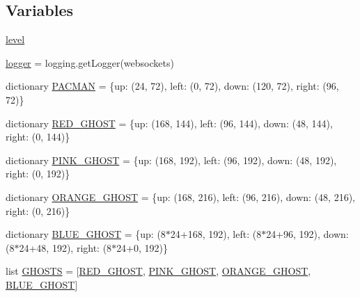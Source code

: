 \subsection*{Variables}
\begin{DoxyCompactItemize}
\item 
\hyperlink{namespaceviewer_ae5293c9bdae639c8c4c58c076722d755}{level}
\item 
\hyperlink{namespaceviewer_a7a420ec0e1bb58775b845f32c4674daa}{logger} = logging.\+get\+Logger(\textquotesingle{}websockets\textquotesingle{})
\item 
dictionary \hyperlink{namespaceviewer_a3bd33705051ffc40b5bfd35e243ae0ac}{P\+A\+C\+M\+AN} = \{\textquotesingle{}up\textquotesingle{}\+: (24, 72), \textquotesingle{}left\textquotesingle{}\+: (0, 72), \textquotesingle{}down\textquotesingle{}\+: (120, 72), \textquotesingle{}right\textquotesingle{}\+: (96, 72)\}
\item 
dictionary \hyperlink{namespaceviewer_a49becc796180fd2036cad73589a3cfcc}{R\+E\+D\+\_\+\+G\+H\+O\+ST} = \{\textquotesingle{}up\textquotesingle{}\+: (168, 144), \textquotesingle{}left\textquotesingle{}\+: (96, 144), \textquotesingle{}down\textquotesingle{}\+: (48, 144), \textquotesingle{}right\textquotesingle{}\+: (0, 144)\}
\item 
dictionary \hyperlink{namespaceviewer_abe62d2acf5d0c83805fa210e5e88eca2}{P\+I\+N\+K\+\_\+\+G\+H\+O\+ST} = \{\textquotesingle{}up\textquotesingle{}\+: (168, 192), \textquotesingle{}left\textquotesingle{}\+: (96, 192), \textquotesingle{}down\textquotesingle{}\+: (48, 192), \textquotesingle{}right\textquotesingle{}\+: (0, 192)\}
\item 
dictionary \hyperlink{namespaceviewer_a8dd3905e87c1c9dfdb99de2c99d24bd8}{O\+R\+A\+N\+G\+E\+\_\+\+G\+H\+O\+ST} = \{\textquotesingle{}up\textquotesingle{}\+: (168, 216), \textquotesingle{}left\textquotesingle{}\+: (96, 216), \textquotesingle{}down\textquotesingle{}\+: (48, 216), \textquotesingle{}right\textquotesingle{}\+: (0, 216)\}
\item 
dictionary \hyperlink{namespaceviewer_a597b296be3b6c09a7759a6b15e8691d2}{B\+L\+U\+E\+\_\+\+G\+H\+O\+ST} = \{\textquotesingle{}up\textquotesingle{}\+: (8$\ast$24+168, 192), \textquotesingle{}left\textquotesingle{}\+: (8$\ast$24+96, 192), \textquotesingle{}down\textquotesingle{}\+: (8$\ast$24+48, 192), \textquotesingle{}right\textquotesingle{}\+: (8$\ast$24+0, 192)\}
\item 
list \hyperlink{namespaceviewer_acf3b118d8806b60e75950eb17c346ff7}{G\+H\+O\+S\+TS} = \mbox{[}\hyperlink{namespaceviewer_a49becc796180fd2036cad73589a3cfcc}{R\+E\+D\+\_\+\+G\+H\+O\+ST}, \hyperlink{namespaceviewer_abe62d2acf5d0c83805fa210e5e88eca2}{P\+I\+N\+K\+\_\+\+G\+H\+O\+ST}, \hyperlink{namespaceviewer_a8dd3905e87c1c9dfdb99de2c99d24bd8}{O\+R\+A\+N\+G\+E\+\_\+\+G\+H\+O\+ST}, \hyperlink{namespaceviewer_a597b296be3b6c09a7759a6b15e8691d2}{B\+L\+U\+E\+\_\+\+G\+H\+O\+ST}\mbox{]}

\end{DoxyCompactItemize}
